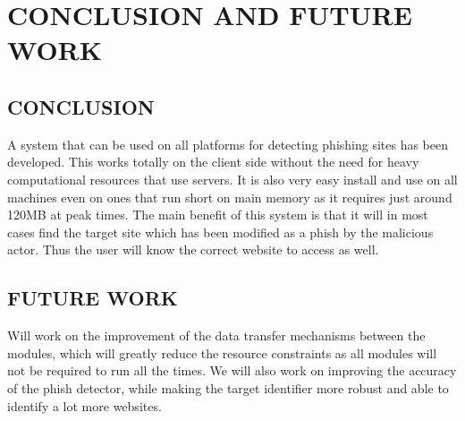 
\chapter{CONCLUSION AND FUTURE WORK} %
\section{CONCLUSION}
A system that can be used on all platforms for detecting phishing sites has been developed. This works totally on the client side without the need for heavy computational resources that use servers. It is also very easy install and use on all machines even on ones that run short on main memory as it requires just around 120MB at peak times. The main benefit of this system is that it will in most cases find the target site which has been modified as a phish by the malicious actor. Thus the user will know the correct website to access as well.

\section{FUTURE WORK}
Will work on the improvement of the data transfer mechanisms between the modules, which will greatly reduce the resource constraints as all modules will not be required to run all the times. We will also work on improving the accuracy of the phish detector, while making the target identifier more robust and able to identify a lot more websites.